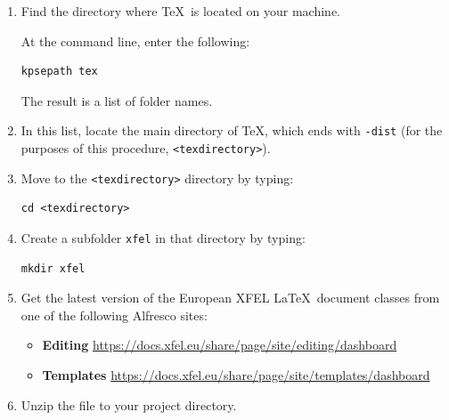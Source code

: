 \documentclass[]{xfel.eu-report}
\begin{document}
\begin{enumerate}
  \item Find the directory where \TeX\ is located on your machine.
  \linebreak
  
  At the command line, enter the following:

		\begin{tcolorbox}[enlarge top by=\baselineheight, enlarge bottom by=\baselineheight]
\begin{Verbatim}[fontsize=\small]
kpsepath tex
\end{Verbatim}
		\end{tcolorbox}
	
	The result is a list of folder names.\linebreak
	\item In this list, locate the main directory of \TeX, which ends with
	\texttt{-dist} (for the purposes of this procedure, \texttt{<texdirectory>}).
	  
	\vspace*{\baselineheight}
	\item Move to the \texttt{<texdirectory>} directory by typing:
	
		\begin{tcolorbox}[enlarge top by=\baselineheight, enlarge bottom by=\baselineheight]
		\begin{Verbatim}[fontsize=\small]
cd <texdirectory>
		\end{Verbatim}
		\end{tcolorbox}

	\item Create a subfolder \texttt{xfel} in that directory by typing: 
	
		\begin{tcolorbox}[enlarge top by=\baselineheight, enlarge bottom by=\baselineheight]
		\begin{Verbatim}[fontsize=\small]
mkdir xfel
		\end{Verbatim}
		\end{tcolorbox}
	
 \item Get the latest version of the European XFEL \LaTeX\ document classes from one of the following Alfresco sites:
  \linebreak
	\begin{itemize}
		\item {\bf Editing} 
		\linebreak
		\url{https://docs.xfel.eu/share/page/site/editing/dashboard}
		\linebreak
		\item {\bf Templates} 
		\linebreak
		\url{https://docs.xfel.eu/share/page/site/templates/dashboard}
		\linebreak
	\end{itemize} 
  \item Unzip the file to your project directory.
  

\end{enumerate}
\end{document}

